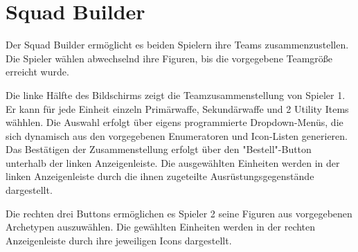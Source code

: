 \chapter{Squad Builder}

Der Squad Builder ermöglicht es beiden Spielern ihre Teams zusammenzustellen. Die Spieler wählen abwechselnd ihre Figuren, bis die vorgegebene Teamgröße erreicht wurde. 

Die linke Hälfte des Bildschirms zeigt die Teamzusammenstellung von Spieler 1. Er kann für jede Einheit einzeln Primärwaffe, Sekundärwaffe und 2 Utility Items wähhlen. Die Auswahl erfolgt über eigens programmierte Dropdown-Menüs, die sich dynamisch aus den vorgegebenen Enumeratoren und Icon-Listen generieren. Das Bestätigen der Zusammenstellung erfolgt über den "Bestell"-Button unterhalb der linken Anzeigenleiste.   
Die ausgewählten Einheiten werden in der linken Anzeigenleiste durch die ihnen zugeteilte Ausrüstungsgegenstände dargestellt.  

Die rechten drei Buttons ermöglichen es Spieler 2 seine Figuren aus vorgegebenen Archetypen auszuwählen. Die gewählten Einheiten werden in der rechten Anzeigenleiste durch ihre jeweiligen Icons dargestellt. 

